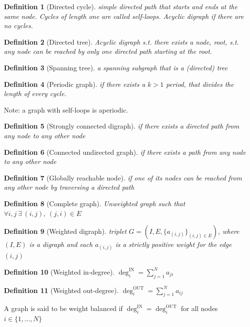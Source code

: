 \documentclass{book}
\theoremstyle{theoremv2}
\theoremstyle{defv2}
\newtheorem{definition}{Definition}[chapter]
\theoremstyle{remark}
\theoremstyle{remark}
\theoremstyle{definition}
\theoremstyle{definition}
\begin{document}
\begin{definition}[Directed cycle]
    simple directed path that starts and ends at the same node. Cycles of length one are called self-loops. Acyclic digraph if there are no cycles.
\end{definition}
\begin{definition}[Directed tree]
    Acyclic digraph s.t. there exists a node, root, s.t. any node can be reached by only one directed path starting at the root.
\end{definition}
\begin{definition}[Spanning tree]
    a spanning subgraph that is a (directed) tree
\end{definition}
\begin{definition}[Periodic graph]
    if there exists a $k>1$ period, that divides the length of every cycle.
\end{definition}
Note: a graph with self-loops is aperiodic.
\begin{definition}[Strongly connected digraph]
    if there exists a directed path from any node to any other node
\end{definition}
\begin{definition}[Connected undirected graph]
    if there exists a path from any node to any other node
\end{definition}
\begin{definition}[Globally reachable node]
    if one of its nodes can be reached from any other node by traversing a directed path
\end{definition}
\begin{definition}[Complete graph]
    Unweighted graph such that $\forall i,j\ \exists \ (i,j),\ (j,i) \in E$
\end{definition}
\begin{definition}[Weighted digraph]
    triplet $G=(I,E,\{a_{(i,j)}\}_{(i,j)\in E})$, where $(I,E)$ is a digraph and each $a_(i,j)$ is a strictly positive weight for the edge $(i,j)$
\end{definition}
\begin{definition}[Weighted in-degree]
    $\deg_i^\text{IN} = \displaystyle\sum_{j=1}^{N}a_{ji}$
\end{definition}
\begin{definition}[Weighted out-degree]
    $\deg_i^\text{OUT} = \displaystyle\sum_{j=1}^{N}a_{ij}$
\end{definition}
A graph is said to be weight balanced if $\deg_i^\text{IN} = \deg_i^\text{OUT}$ for all nodes $i\in\{1,\dots,N\}$
\end{document}
